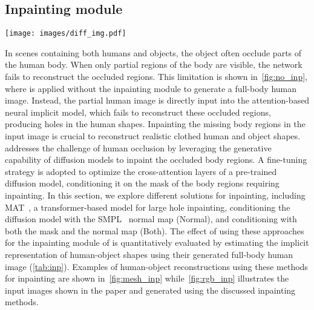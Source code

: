 \subsection{Inpainting module}
\begin{table}[h]
\centering
\resizebox{\linewidth}{!}
{}
\vspace{-3mm}
\caption{Quantitative evaluation of changing the diffusion module of \name. The human-object shapes reconstructed with the attention-based neural implicit module of \name are used for evaluation.}
\label{tab:inp}
\end{table}
\begin{figure*}[t]
  \centering
\texttt{[image: images/diff\_img.pdf]}
\vspace{-6mm}
\caption{Visual comparisons of inpainted images generated using different inpainting approaches.}
\label{fig:rgb_inp}
\end{figure*}
\noindent In scenes containing both humans and objects, the object often occlude parts of the human body. When only partial regions of the body are visible, the network fails to reconstruct the occluded regions. 
This limitation is shown in~\cref{fig:no_inp}, where \name is applied without the inpainting module to generate a full-body human image. Instead, the partial human image is directly input into the attention-based neural implicit model, which fails to reconstruct these occluded regions, producing holes in the human shapes. Inpainting the missing body regions in the input image is crucial to reconstruct realistic clothed human and object shapes.
\\\name addresses the challenge of human occlusion by leveraging the generative capability of diffusion models to inpaint the occluded body regions. A fine-tuning strategy is adopted to optimize the cross-attention layers of a pre-trained diffusion model, conditioning it on the mask of the body regions requiring inpainting. In this section, we explore different solutions for inpainting, including MAT~\cite{li2022mat}, a transformer-based model for large hole inpainting, conditioning the diffusion model with the SMPL~\cite{smplh} normal map (Normal), and conditioning with both the mask and the normal map (Both). 
The effect of using these approaches for the inpainting module of \name is quantitatively evaluated by estimating the implicit representation of human-object shapes using their generated full-body human image (\cref{tab:inp}). Examples of human-object reconstructions using these methods for inpainting are shown in~\cref{fig:mesh_inp} while~\cref{fig:rgb_inp} illustrates the input images shown in the paper and generated using the discussed inpainting methods.
